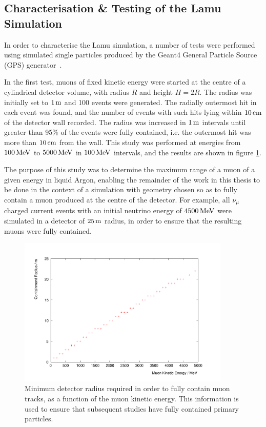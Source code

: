 \subsection{Characterisation \& Testing of the Lamu Simulation}
In order to characterise the Lamu simulation, a number of tests were performed using simulated single particles produced by the Geant4 General Particle Source (GPS) generator~\citep{GeantGPS}.

In the first test, muons of fixed kinetic energy were started at the centre of a cylindrical detector volume, with radius $R$ and height $H=2R$. The radius was initially set to $1\metre$ and 100 events were generated. The radially outermost hit in each event was found, and the number of events with such hits lying within $10\cm$ of the detector wall recorded. The radius was increased in $1\metre$ intervals until greater than 95\% of the events were fully contained, i.e. the outermost hit was more than $10\cm$ from the wall. This study was performed at energies from $100\MeV$ to $5000\MeV$ in $100\MeV$ intervals, and the results are shown in figure \ref{fig:lamu-containment-radius}.

The purpose of this study was to determine the maximum range of a muon of a given energy in liquid Argon, enabling the remainder of the work in this thesis to be done in the context of a simulation with geometry chosen so as to fully contain a muon produced at the centre of the detector. For example, all $\nu_\mu$ charged current events with an initial neutrino energy of $4500\MeV$ were simulated in a detector of $25\metre$ radius, in order to ensure that the resulting muons were fully contained.

\begin{figure}
\centering
\includegraphics[angle=-90,width=0.9\textwidth]{chapters/detectorphysics_images/containment_radius}
\caption[Detector radius required for full containment as a function of energy]{\label{fig:lamu-containment-radius}Minimum detector radius required in order to fully contain muon tracks, as a function of the muon kinetic energy. This information is used to ensure that subsequent studies have fully contained primary particles.}
\end{figure}

